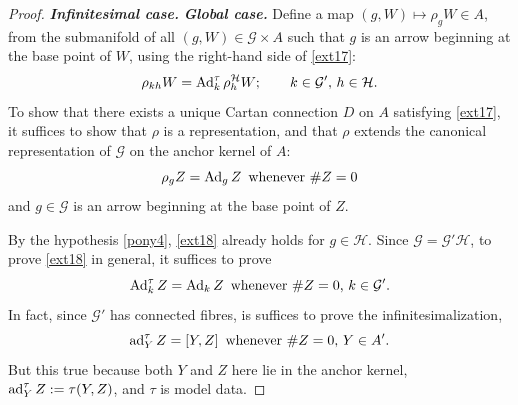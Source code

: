 \documentclass[leqno,12pt]{amsart} %
\begin{document}
\begin{proof}{\em \bfseries Infinitesimal case.}
  {\em \bfseries Global case.} Define a map $(g, W) \mapsto \rho_gW \in A$, from the
  submanifold of all $(g, W) \in {\mathcal G} \times A$ such that $g$ is an arrow
  beginning at the base point of $W$, using the right-hand side of \eqref{ext17}:
  \begin{equation*}
    \rho_{kh}W=\operatorname{Ad}^\tau_k \rho^{\mathcal H}_hW;\qquad k \in {\mathcal G}',\,h \in {\mathcal H}.
  \end{equation*}
  To show that there exists a unique Cartan connection $D$ on $A$ satisfying
  \eqref{ext17}, it suffices to show that $\rho$ is a representation, and that $\rho $
  extends the canonical representation of ${\mathcal G} $ on the anchor kernel of $A$:
  \begin{equation}
    \rho_gZ = \operatorname{Ad}_gZ\enspace\text{whenever $\#Z=0$}\label{ext18}
  \end{equation}
  and $g \in {\mathcal G} $ is an arrow beginning at the base point of $Z$.

  By the hypothesis \eqref{pony4}, \eqref{ext18} already holds for $g \in {\mathcal
    H}$. Since ${\mathcal G} ={\mathcal G}' {\mathcal H} $, to prove \eqref{ext18} in
  general, it suffices to prove
  \begin{equation}
    \operatorname{Ad}^\tau_k Z= \operatorname{Ad}_kZ\enspace\text{whenever $\#Z=0$, $k \in {\mathcal G}'$} .
  \end{equation}
  In fact, since ${\mathcal G}'$ has connected fibres, is suffices to prove the
  infinitesimalization,
  \begin{equation*}
          \operatorname{ad}^\tau_YZ = [Y, Z]\enspace\text{whenever $\#Z=0$, $Y \in A'$.}
  \end{equation*}
  But this true because both $Y$ and $Z$ here lie in the anchor kernel,
  $\operatorname{ad}^\tau_YZ:=\tau(Y,Z)$, and $\tau $ is model data.


\end{proof}
\end{document}
